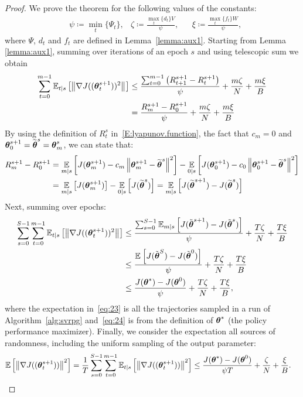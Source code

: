 \begin{proof}
	We prove the theorem for the following values of the constants:
	\begin{align*}
	& \psi \coloneqq \min_t\{\Psi_t\}, 
	& \zeta \coloneqq \frac{\max_t\{d_t\}V}{\psi}, 
	&& \xi \coloneqq \frac{\max_t\{f_t\}W}{\psi},
	\end{align*}
	where $\Psi$, $d_t$ and $f_t$ are defined in Lemma~\ref{lemma:aux1}.
	Starting from Lemma \ref{lemma:aux1}, summing over iterations of an epoch $s$ and using telescopic sum we obtain
	\begin{align*}
	\sum_{t=0}^{m-1}\Ets{\norm[]{\gradJ{(\vtheta_t^{s+1})}^2}}&\leq
	\frac{\sum_{t=0}^{m-1}\left(R_{t+1}^{s+1} - R_t^{s+1}\right)}{\psi} + \frac{m\zeta}{N} + \frac{m\xi}{B} \nonumber\\
	& = \frac{R^{s+1}_m - R^{s+1}_0}{\psi}  + \frac{m\zeta}{N} + \frac{m\xi}{B}
	\end{align*}
	By using the definition of $R^s_t$ in~\eqref{E:lyapunov.function}, the fact that $c_m = 0$ and $\vtheta^{s+1}_0 = \wt{\vtheta}^s = \vtheta^s_m$, we can state that:
	\begin{align*}
	R^{s+1}_m - R^{s+1}_0 
	&= \EVV[m|s]{J(\vtheta^{s+1}_{m})- c_m \norm[]{\vtheta^{s+1}_{m} - \wt{\vtheta}^s}^2 } - \EVV[0|s]{J(\vtheta^{s+1}_{0}) - c_0 \norm[]{\vtheta^{s+1}_0 - \wt{\vtheta}^s}^2}\\
	&= \EVV[m|s]{J(\vtheta^{s+1}_{m})} - \EVV[0|s]{J(\wt{\vtheta}^s)}
	= \EVV[m|s]{J(\wt{\vtheta}^{s+1}) - J(\wt{\vtheta}^s)}
	\end{align*}
	Next, summing over epochs:
	\begin{align}
	\sum_{s=0}^{S-1}\sum_{t=0}^{m-1}\Ets{\norm[]{\gradJ{(\vtheta_t^{s+1})}^2}}&\leq
	\frac{\sum_{s=0}^{S-1}\Ets[m]{J(\tilde{\vtheta}^{s+1}) - J(\tilde{\vtheta}^{s})}}{\psi} + \frac{T\zeta}{N} + \frac{T\xi}{B} \nonumber\\
	&\leq
	\frac{\EVV[]{J(\tilde{\vtheta}^{S}) - J(\tilde{\vtheta}^{0})}}{\psi} + \frac{T\zeta}{N} + \frac{T\xi}{B}
	\label{eq:23}\\
	&\leq
	\frac{J(\vtheta^*) - J(\vtheta^0)}{\psi} + \frac{T\zeta}{N} + \frac{T\xi}{B}, \label{eq:24}
	\end{align}
	where the expectation in~\eqref{eq:23} is \wrt all the trajectories sampled in a run of Algorithm~\ref{alg:svrpg} and~\eqref{eq:24} is from the definition of $\vtheta^*$ (\ie the policy performance maximizer).
	Finally, we consider the expectation \wrt all sources of randomness, including the uniform sampling of the output parameter:
	\begin{align*}
	\EVV[]{\norm[]{\gradJ{(\vtheta_t^{s+1})}}^2} 
	&=\frac{1}{T}\sum_{s=0}^{S-1}\sum_{t=0}^{m-1}\Ets{\norm[]{\gradJ{(\vtheta_t^{s+1})}}^2} 
	\leq
	\frac{J(\vtheta^*) - J(\vtheta^0)}{\psi T} + \frac{\zeta}{N} + \frac{\xi}{B}.
	\end{align*}
 \end{proof}

